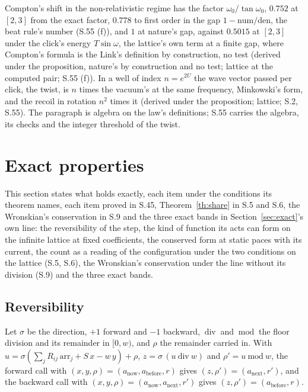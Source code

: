 \documentclass[pdflatex,sn-mathphys-num]{sn-jnl}
\newcommand{\num}{\mathrm{num}}
\newcommand{\den}{\mathrm{den}}
\newcommand{\anow}{a_{\mathrm{now}}}
\newcommand{\abefore}{a_{\mathrm{before}}}
\newcommand{\anext}{a_{\mathrm{next}}}
\newcommand{\ddiv}{\ \mathrm{div}\ }
\newcommand{\dmod}{\ \mathrm{mod}\ }
\theoremstyle{thmstyleone}
\theoremstyle{thmstyletwo}
\begin{document}
Compton's shift in the non-relativistic regime \cite{compton} has the factor $\omega_0 / \tan\omega_0$, $0.752$ at $[2, 3]$ from the exact factor, $0.778$ to first order in the gap $1 - \num / \den$, the beat rule's number (S.55 (f)), and $1$ at nature's gap, against $0.5015$ at $[2, 3]$ under the click's energy $T\sin\omega$, the lattice's own term at a finite gap, where Compton's formula is the Link's definition by construction, no test (derived under the proposition, nature's by construction and no test; lattice at the computed pair; S.55 (f)). In a well of index $n = e^{2U}$ the wave vector passed per click, the twist, is $n$ times the vacuum's at the same frequency, Minkowski's form, and the recoil in rotation $n^2$ times it (derived under the proposition; lattice; S.2, S.55). The paragraph is algebra on the law's definitions; S.55 carries the algebra, its checks and the integer threshold of the twist.
\section{Exact properties}\label{sec:theorems}

This section states what holds exactly, each item under the conditions its theorem names, each item proved in S.45, Theorem~\ref{th:share} in S.5 and S.6, the Wronskian's conservation in S.9 and the three exact bands in Section~\ref{sec:exact}'s own line: the reversibility of the step, the kind of function its acts can form on the infinite lattice at fixed coefficients, the conserved form at static paces with its current, the count as a reading of the configuration under the two conditions on the lattice (S.5, S.6), the Wronskian's conservation under the line without its division (S.9) and the three exact bands.

\subsection{Reversibility}\label{sec:direction}

Let $\sigma$ be the direction, $+1$ forward and $-1$ backward, $\ddiv$ and $\dmod$ the floor division and its remainder in $[0, w)$, and $\rho$ the remainder carried in. With $u = \sigma(\sum_j R_{ij}\,\mathrm{arr}_j + S\,x - w\,y) + \rho$, $z = \sigma\,(u \ddiv w)$ and $\rho' = u \dmod w$, the forward call with $(x, y, \rho) = (\anow, \abefore, r)$ gives $(z, \rho') = (\anext, r')$, and the backward call with $(x, y, \rho) = (\anow, \anext, r')$ gives $(z, \rho') = (\abefore, r)$.
\end{document}
